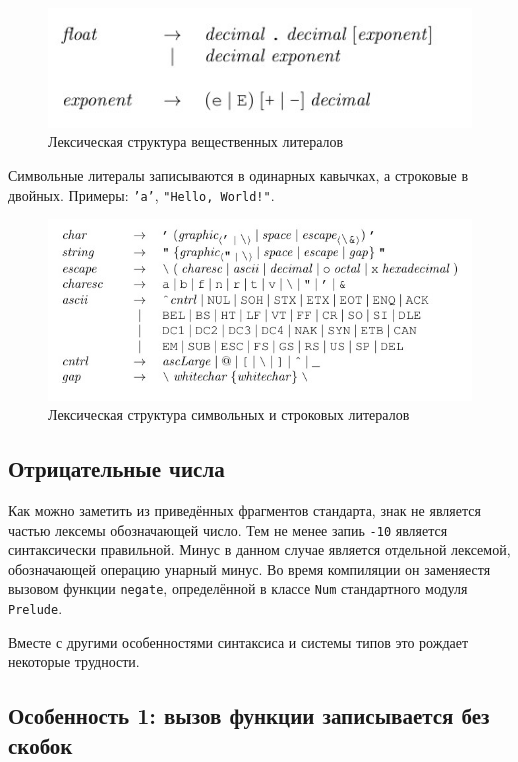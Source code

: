 \begin{figure}[H]
\centering
\includegraphics[scale=0.7]{pic-rational-literals}
\caption{Лексическая структура вещественных литералов\cite{haskell2010}}
\end{figure}

Символьные литералы записываются в одинарных кавычках, а строковые в двойных.
Примеры: \texttt{'a'}, \texttt{"Hello, World!"}.

\begin{figure}[H]
\centering
\includegraphics[scale=0.7]{pic-char-string-literals}
\caption
{Лексическая структура символьных и строковых литералов\cite{haskell2010}}
\end{figure}

\subsection{Отрицательные числа}

Как можно заметить из приведённых фрагментов стандарта, знак не является частью
лексемы обозначающей число. Тем не менее запиь \texttt{-10} является
синтаксически правильной. Минус в данном случае является отдельной лексемой,
обозначающей операцию унарный минус. Во время компиляции он заменяестя вызовом
функции \texttt{negate}, определённой в классе \texttt{Num} стандартного модуля
\texttt{Prelude}.

Вместе с другими особенностями синтаксиса и системы типов это рождает некоторые
трудности.

\subsection{Особенность 1: вызов функции записывается без скобок}

